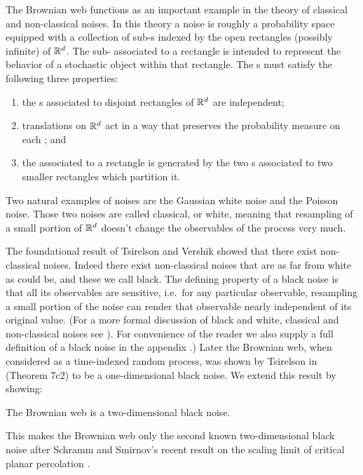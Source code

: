 {The Brownian web functions as an important example in the theory of
classical and non-classical noises. In this
theory a noise is roughly a probability space equipped with a collection
of sub-\sigfield{}s indexed by the open rectangles (possibly infinite) of
$\mathbb{R}^d$.  The sub-\sigfield{} associated to a rectangle is intended to
represent the behavior of a stochastic object within that rectangle.
The \sigfield{}s must satisfy the following three properties:
\begin{enumerate}
\item the \sigfield{}s associated to disjoint rectangles of $\mathbb{R}^d$ are
independent;
\item translations on $\mathbb{R}^d$ act in a way that preserves the
probability measure on each \sigfield{}; and
\item the \sigfield{}
associated to a rectangle is generated by the two \sigfield{}s
associated to two smaller rectangles which partition it.
\end{enumerate}
Two natural examples of noises are the Gaussian white noise
and the Poisson noise. Those two noises are called classical, or white,
meaning that
resampling of a small portion of $\mathbb{R}^d$ doesn't change the observables of the
process very much.

The foundational result of Tsirelson and Vershik \cite{tsirelson-vershik} showed that there
exist non-classical noises.  Indeed there exist non-classical noises
that are as far from white as could be, and these we call black.  The
defining property of a black noise is that all its observables are
sensitive, i.e.\ for any particular observable, resampling a small portion of the noise can
render that observable nearly independent of its original
value.  (For a more formal discussion of black and white, classical
and non-classical noises see \cite{tsirelson-nonclassical-stochastic-flows}).  For convenience of the reader
we also supply a full definition of a black noise in
the appendix .)  Later the Brownian web,
when considered as a time-indexed random process,
was shown by Tsirelson in
\cite{tsirelson-scaling-limit-noise-stability} (Theorem 7c2)
to be a one-dimensional black noise.  We
extend this
result by showing:

\begin{theorem}
\label{thm:bw-2d-black-noise}
The Brownian web is a
two-dimensional black noise.
\end{theorem}

This makes the Brownian web only the second
known two-dimensional black noise after Schramm and Smirnov's
recent result on the scaling limit of critical planar
percolation \cite{schramm-smirnov}.

}
